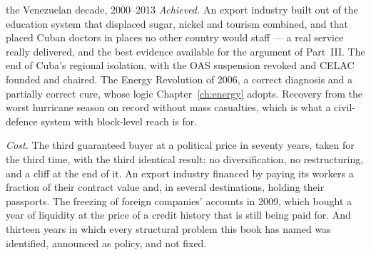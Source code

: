 \begin{ledger}{the Venezuelan decade, 2000--2013}
\emph{Achieved.} An export industry built out of the education system that
displaced sugar, nickel and tourism combined, and that placed Cuban doctors in
places no other country would staff --- a real service really delivered, and
the best evidence available for the argument of Part~III. The end of Cuba's
regional isolation, with the OAS suspension revoked and CELAC founded and
chaired. The Energy Revolution of 2006, a correct diagnosis and a partially
correct cure, whose logic Chapter~\ref{ch:energy} adopts. Recovery from the
worst hurricane season on record without mass casualties, which is what a
civil-defence system with block-level reach is for.

\emph{Cost.} The third guaranteed buyer at a political price in seventy years,
taken for the third time, with the third identical result: no diversification,
no restructuring, and a cliff at the end of it. An export industry financed by
paying its workers a fraction of their contract value and, in several
destinations, holding their passports. The freezing of foreign companies'
accounts in 2009, which bought a year of liquidity at the price of a credit
history that is still being paid for. And thirteen years in which every
structural problem this book has named was identified, announced as policy, and
not fixed.
\end{ledger}
